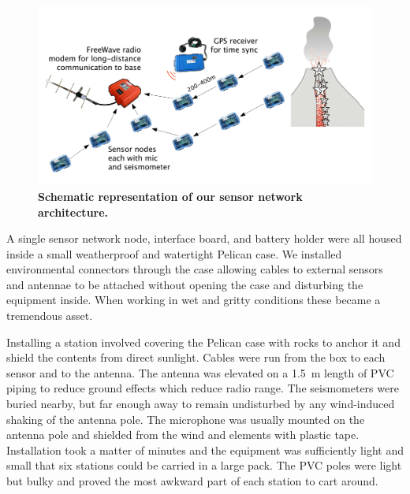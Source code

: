 \begin{figure}[t]
\label{casestudy-fig-picture}
\begin{center}
\includegraphics[width=0.7\hsize]{./4-casestudy/figs/schematic}
\end{center}
\caption{\textbf{Schematic representation of our sensor network
architecture.}}
\end{figure}

A single sensor network node, interface board, and battery holder were all
housed inside a small weatherproof and watertight Pelican case.  We installed
environmental connectors through the case allowing cables to external sensors
and antennae to be attached without opening the case and disturbing the
equipment inside.  When working in wet and gritty conditions these became a
tremendous asset.


Installing a station involved covering the Pelican case with rocks to anchor
it and shield the contents from direct sunlight.  Cables were run from the
box to each sensor and to the antenna.  The antenna was elevated on a 1.5~m
length of PVC piping to reduce ground effects which reduce radio range.  The
seismometers were buried nearby, but far enough away to remain undisturbed by
any wind-induced shaking of the antenna pole.  The microphone was usually
mounted on the antenna pole and shielded from the wind and elements with
plastic tape.  Installation took a matter of minutes and the equipment was
sufficiently light and small that six stations could be carried in a large
pack.  The PVC poles were light but bulky and proved the most awkward part of
each station to cart around.

